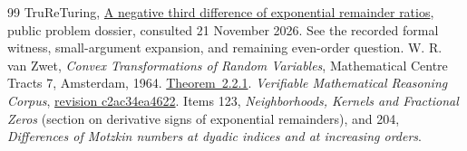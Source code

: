 \documentclass[11pt,a4paper]{article}
\begin{document}
\begin{thebibliography}{99}
 TruReTuring, \href{https://www.trureturing.org/research/sitnik-1993-exponential-remainder-differences/}{A negative third difference of exponential remainder ratios}, public problem dossier, consulted 21 November 2026. See the recorded formal witness, small-argument expansion, and remaining even-order question.
 W. R. van Zwet, \emph{Convex Transformations of Random Variables}, Mathematical Centre Tracts 7, Amsterdam, 1964. \href{https://ir.cwi.nl/pub/13087/13087D.pdf}{Theorem~2.2.1}.
 \emph{Verifiable Mathematical Reasoning Corpus}, \href{https://github.com/QEEDDD/Verifiable-Mathematical-Reasoning-Corpus/tree/c2ac34ea4622778187173f41bb1996deee8081b7}{revision c2ac34ea4622}. Items 123, \emph{Neighborhoods, Kernels and Fractional Zeros} (section on derivative signs of exponential remainders), and 204, \emph{Differences of Motzkin numbers at dyadic indices and at increasing orders}.
\end{thebibliography}
\end{document}
